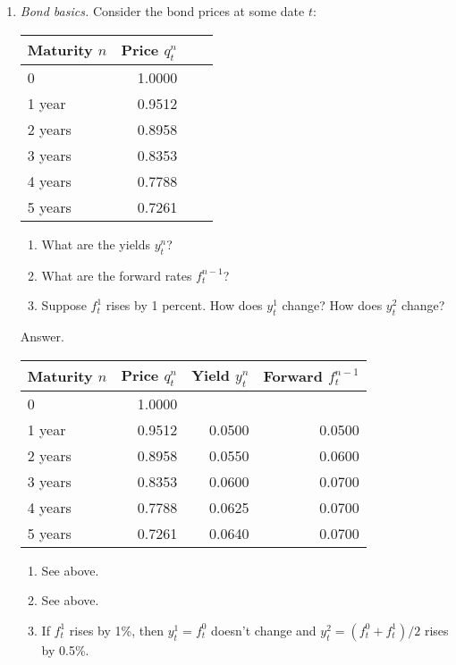 \documentclass[11pt]{article}
\begin{document}
\begin{enumerate}
\item {\it Bond basics.\/}
Consider the bond prices at some date $t$:
%
\begin{center}
\tabcolsep=0.1in
\begin{tabular}{lrrr}
\toprule
Maturity $n$   & \phantom{xx} Price $q^n_t$ \\ %
\midrule
0           &    1.0000   \\
1 year      &    0.9512   \\
2 years     &    0.8958   \\
3 years     &    0.8353   \\
4 years     &    0.7788   \\
5 years     &    0.7261   \\
\bottomrule
\end{tabular}
\end{center}
%
\begin{enumerate}
\item What are the yields $y^n_t$?
\item What are the forward rates $f^{n-1}_t$?
\item Suppose $f^1_t$ rises by 1 percent.
How does $y^1_t$ change?
How does $y^2_t$ change?
\end{enumerate}
%
Answer.
\begin{center}
\tabcolsep=0.1in
\begin{tabular}{lrrr}
\toprule
Maturity $n$   & \phantom{xx} Price $q^n_t$ & \phantom{xx} Yield $y^n_t$ & Forward $f^{n-1}_t$ \\
\midrule
0           &    1.0000  \\
1 year      &    0.9512  & 0.0500 & 0.0500 \\
2 years     &    0.8958  & 0.0550 & 0.0600 \\
3 years     &    0.8353  & 0.0600 & 0.0700 \\
4 years     &    0.7788  & 0.0625 & 0.0700 \\
5 years     &    0.7261  & 0.0640 & 0.0700 \\
\bottomrule
\end{tabular}
\end{center}
\medskip

\begin{enumerate}
\item See above.
\item See above.
\item If $f^1_t$ rises by 1\%, then $y^1_t= f^0_t$ doesn't change
and $y^2_t = (f^0_t+f^1_t)/2 $ rises by 0.5\%.
\end{enumerate}



\end{enumerate}
\end{document}
